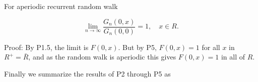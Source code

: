For aperiodic recurrent random walk

$$\lim_{n \to \infty} \frac{G_n(0,x)}{G_n(0,0)} = 1, \quad x \in R.$$

Proof: By P1.5, the limit is $F(0,x)$. But by P5, $F(0,x) = 1$ for all $x$ in $R^+ = \bar{R}$, and as the random walk is aperiodic this gives $F(0,x) = 1$ in all of $R$.

Finally we summarize the results of P2 through P5 as